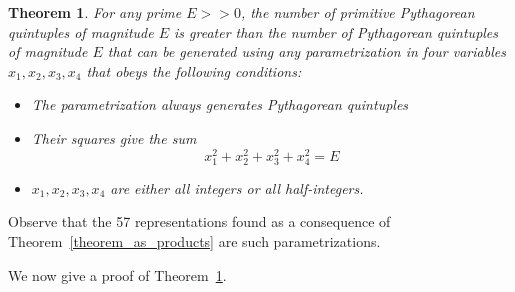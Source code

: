 \documentclass[12pt,table]{article}
\newtheorem{theorem}{Theorem}[section]
\theoremstyle{definition}
\theoremstyle{remark}
\numberwithin{equation}{section}
\begin{document}
\begin{theorem}
\label{theorem_analysis}
For any prime $E >> 0$, the number of primitive  Pythagorean 
quintuples of magnitude $E$ is greater than the number of 
Pythagorean quintuples of magnitude $E$ that can be generated using 
any parametrization in four variables $x_1, x_2, x_3, x_4$ that
obeys the following conditions:
\begin{itemize}
\item[(i)]
The parametrization always 
generates Pythagorean quintuples

\item[(ii)]
Their squares give the sum
$$
     x_1^2 + x_2^2 + x_3^2 + x_4^2 = E
$$

\item[(iii)]
$x_1, x_2, x_3, x_4$ are either all integers or
all half-integers.
\end{itemize}
\end{theorem}


Observe that the 57 representations found as a consequence of
Theorem~\ref{theorem_as_products} are such parametrizations.


We now give a 
proof of Theorem~\ref{theorem_analysis}.
\end{document}
